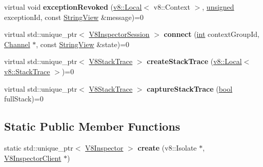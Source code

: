 \begin{DoxyCompactItemize}
\item 
\mbox{\label{classv8__inspector_1_1V8Inspector_a6853e6b53df0a0058b0e7ff2a3cc94ec}} 
virtual void {\bfseries exception\+Revoked} (\mbox{\hyperlink{classv8_1_1Local}{v8\+::\+Local}}$<$ v8\+::\+Context $>$, \mbox{\hyperlink{classunsigned}{unsigned}} exception\+Id, const \mbox{\hyperlink{classv8__inspector_1_1StringView}{String\+View}} \&message)=0
\item 
\mbox{\label{classv8__inspector_1_1V8Inspector_ada36fa35ede4b3fda70b07fc855458e4}} 
virtual std\+::unique\+\_\+ptr$<$ \mbox{\hyperlink{classv8__inspector_1_1V8InspectorSession}{V8\+Inspector\+Session}} $>$ {\bfseries connect} (\mbox{\hyperlink{classint}{int}} context\+Group\+Id, \mbox{\hyperlink{classv8__inspector_1_1V8Inspector_1_1Channel}{Channel}} $\ast$, const \mbox{\hyperlink{classv8__inspector_1_1StringView}{String\+View}} \&state)=0
\item 
\mbox{\label{classv8__inspector_1_1V8Inspector_a4ac935e4871eef8ee5cb2e5ca41a2142}} 
virtual std\+::unique\+\_\+ptr$<$ \mbox{\hyperlink{classv8__inspector_1_1V8StackTrace}{V8\+Stack\+Trace}} $>$ {\bfseries create\+Stack\+Trace} (\mbox{\hyperlink{classv8_1_1Local}{v8\+::\+Local}}$<$ \mbox{\hyperlink{classv8_1_1StackTrace}{v8\+::\+Stack\+Trace}} $>$)=0
\item 
\mbox{\label{classv8__inspector_1_1V8Inspector_a22af900e1627ca8ef9382c0507645d70}} 
virtual std\+::unique\+\_\+ptr$<$ \mbox{\hyperlink{classv8__inspector_1_1V8StackTrace}{V8\+Stack\+Trace}} $>$ {\bfseries capture\+Stack\+Trace} (\mbox{\hyperlink{classbool}{bool}} full\+Stack)=0
\end{DoxyCompactItemize}
\subsection*{Static Public Member Functions}
\begin{DoxyCompactItemize}
\item 
\mbox{\label{classv8__inspector_1_1V8Inspector_a9a2e03efe985976a6885b1d152091cdb}} 
static std\+::unique\+\_\+ptr$<$ \mbox{\hyperlink{classv8__inspector_1_1V8Inspector}{V8\+Inspector}} $>$ {\bfseries create} (v8\+::\+Isolate $\ast$, \mbox{\hyperlink{classv8__inspector_1_1V8InspectorClient}{V8\+Inspector\+Client}} $\ast$)
\end{DoxyCompactItemize}


